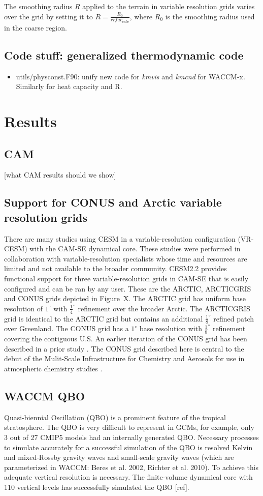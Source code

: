 \documentclass[draft]{agujournal2019}
\begin{document}
The smoothing radius $R$ applied to the terrain in variable resolution grids varies over the grid by setting it to $R=\frac{R_{0}}{rrfac_{cube}}$, where $R_0$ is the smoothing radius used in the coarse region.

\subsection{Code stuff: generalized thermodynamic code}
\begin{itemize}
\item utils/physconst.F90: unify new code for {\em{kmvis}} and {\em{kmcnd}} for WACCM-x. Similarly for heat capacity and R.
\end{itemize}
\section{Results}
\subsection{CAM}
[what CAM results should we show]
\subsection{Support for CONUS and Arctic variable resolution grids}
There are many studies using CESM in a variable-resolution configuration (VR-CESM) with the CAM-SE dynamical core. These studies were performed in collaboration with variable-resolution specialists whose time and resources are limited and not available to the broader community. CESM2.2 provides functional support for three variable-resolution grids in CAM-SE that is easily configured and can be ran by any user. These are the ARCTIC, ARCTICGRIS and CONUS grids depicted in Figure~X. The ARCTIC grid has uniform base resolution of $1^{\circ}$ with $\frac{1}{4}^{\circ}$ refinement over the broader Arctic. The ARCTICGRIS grid is identical to the ARCTIC grid but contains an additional $\frac{1}{8}^{\circ}$ refined patch over Greenland. The CONUS grid has a $1^{\circ}$ base resolution with $\frac{1}{8}^{\circ}$ refinement covering the contiguous U.S. An earlier iteration of the CONUS grid has been described in a prior study \cite{GetAl2017JAMES}. The CONUS grid described here is central to the debut of the Mulit-Scale Infrastructure for Chemistry and Aerosols for use in atmospheric chemistry studies \cite{MUSICA2020}.

\subsection{WACCM QBO}
Quasi-biennial Oscillation (QBO) is a prominent feature of the tropical stratosphere. The QBO is very difficult to represent in GCMs, for example, only 3 out of 27 CMIP5 models had an internally generated QBO. Necessary processes to simulate accurately for a successful simulation of the QBO is resolved Kelvin and mixed-Rossby gravity waves and small-scale gravity waves (which are parameterized in WACCM: Beres et al. 2002, Richter et al. 2010). To achieve this adequate vertical resolution is necessary. The finite-volume dynamical core with 110 vertical levels has successfully simulated the QBO [ref].
\end{document}
